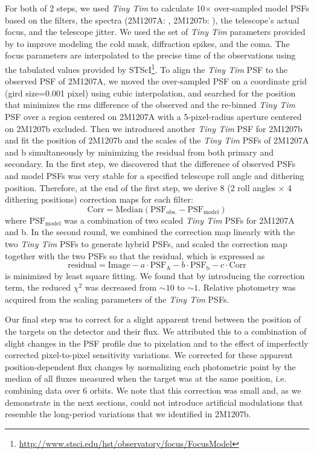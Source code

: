 \documentclass[apj]{emulateapj}
\newcommand{\tinytim}{\textit{Tiny Tim}}
\begin{document}
For both of 2 steps, we used \tinytim{} to calculate 10$\times$
over-sampled model PSFs based on the filters, the spectra (2M1207A:
\cite{Bonnefoy2014}, 2M1207b: \cite{Patience2010}), the telescope's
actual focus, and the telescope jitter.  We used the set of \tinytim{}
parameters provided by \cite{Biretta2014} to improve modeling the cold
mask, diffraction spikes, and the coma. The focus parameters are 
interpolated to the precise time of the observations using the
tabulated values provided by
STScI\footnote{\url{http://www.stsci.edu/hst/observatory/focus/FocusModel}}.
To align the \tinytim{} PSF to the observed PSF of 2M1207A, we
moved the over-sampled PSF on a coordinate grid (gird size=0.001 pixel)
using cubic interpolation, and searched for the position that minimizes
the rms difference of the observed and the re-binned \tinytim{} PSF over
a region centered on 2M1207A with a 5-pixel-radius aperture centered
on 2M1207b excluded.  Then we introduced another \tinytim{} PSF for
2M1207b and fit the position of 2M1207b and the scales of the
\tinytim{} PSFs of 2M1207A and b simultaneously by minimizing the
residual from both primary and secondary. In the first step, we discovered that the
difference of observed PSFs and model PSFs was very stable for a
specified telescope roll angle and dithering position. Therefore, at the end of the first step,
we derive 8 (2 roll angles $\times$ 4 dithering positions) correction
maps for each filter:
\begin{equation}
  \mathrm{Corr = Median(PSF_{obs.} - PSF_{model} )}
\end{equation}
where $\mathrm{PSF_{model}}$ was a combination of two scaled \tinytim{} PSFs
for 2M1207A and b. In the second round, we combined the correction
map linearly with the two \tinytim{} PSFs to generate hybrid PSFs,
and scaled the correction map together with the two PSFs so that the
residual, which is expressed as
\begin{equation}
  \mathrm{residual} = \mathrm{Image} - a\cdot \mathrm{PSF_{A}} - b\cdot
    \mathrm{PSF_{b}}- c\cdot\mathrm{ Corr}
  \end{equation}
  is minimized by least square fitting.
We found that by introducing the correction term,
the reduced $\chi^{2}$ was decreased from $\sim 10$ to
$\sim 1$. Relative photometry was acquired from the scaling
parameters of the \tinytim{} PSFs.


Our final step was to correct for a slight apparent trend between the
position of the targets on the detector and their flux. We attributed
this to a combination of slight changes in the PSF profile due to
pixelation and to the effect of imperfectly corrected pixel-to-pixel
sensitivity variations. We corrected for these apparent
position-dependent flux changes by normalizing each photometric point
by the median of all fluxes measured when the target was at the
same position, i.e. combining data over 6 orbits.  We note that this
correction was small and, as we demonstrate in the next sections,
could not introduce artificial modulations that resemble the long-period
variations that we identified in 2M1207b. 
\end{document}
